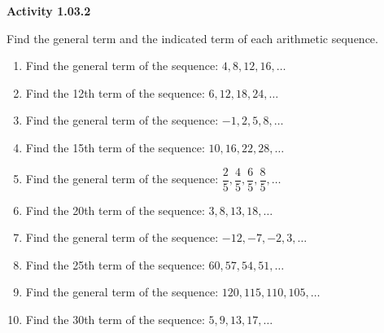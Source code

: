 \vspace{0.3ex}
\noindent\textbf{Activity 1.03.2}

\vspace{0.2ex}

Find the general term and the indicated term of each arithmetic sequence.
\begin{enumerate}
    \item Find the general term of the sequence: $4, 8, 12, 16, \dots$
    \item Find the 12th term of the sequence: $6, 12, 18, 24, \dots$
    \item Find the general term of the sequence: $-1, 2, 5, 8, \dots$
    \item Find the 15th term of the sequence: $10, 16, 22, 28, \dots$
    \item Find the general term of the sequence: $\dfrac{2}{5}, \dfrac{4}{5}, \dfrac{6}{5}, \dfrac{8}{5}, \dots$
    \item Find the 20th term of the sequence: $3, 8, 13, 18, \dots$
    \item Find the general term of the sequence: $-12, -7, -2, 3, \dots$
    \item Find the 25th term of the sequence: $60, 57, 54, 51, \dots$
    \item Find the general term of the sequence: $120, 115, 110, 105, \dots$
    \item Find the 30th term of the sequence: $5, 9, 13, 17, \dots$
\end{enumerate}